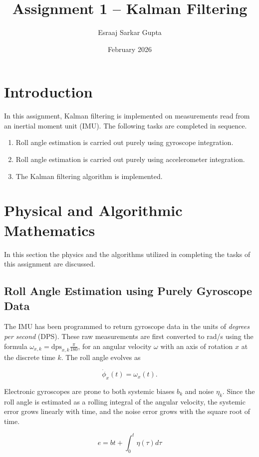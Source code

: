 \documentclass{article}
\title{Assignment 1 -- Kalman Filtering}
\author{Esraaj Sarkar Gupta}
\date{February 2026}
\begin{document}
\maketitle

\section{Introduction}
In this assignment, Kalman filtering is implemented on measurements read from an inertial moment unit (IMU). The following tasks are completed in sequence.

\begin{enumerate}
    \item Roll angle estimation is carried out purely using gyroscope integration.
    \item Roll angle estimation is carried out purely using accelerometer integration.
    \item The Kalman filtering algorithm is implemented.
\end{enumerate}

\section{Physical and Algorithmic Mathematics}
In this section the physics and the algorithms utilized in completing the tasks of this assignment are discussed.

\subsection{Roll Angle Estimation using Purely Gyroscope Data}
The IMU has been programmed to return gyroscope data in the units of \textit{degrees per second} (DPS). These raw measurements are first converted to rad/s using the formula $\omega_{x,k} = \text{dps}_{x,k} \frac{\pi}{180}$, for an angular velocity $\omega$ with an axis of rotation $x$ at the discrete time $k$. The roll angle evolves as

\begin{equation}
    \dot\phi_x(t) = \omega_x(t).
\end{equation}

Electronic gyroscopes are prone to both systemic biases $b_k$ and noise $\eta_k$. Since the roll angle is estimated as a rolling integral of the angular velocity, the systemic error grows linearly with time, and the noise error grows with the square root of time.

\begin{equation}
    e = bt +  \int_0^t \eta(\tau) d\tau
\end{equation}
\end{document}
